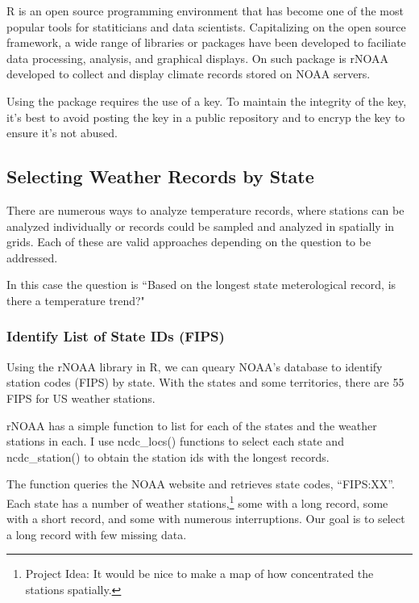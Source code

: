 \documentclass{article}
\begin{document}
R is an open source programming environment that has become one of the most popular tools for statiticians and data scientists. Capitalizing on the open source framework, a wide range of libraries or packages have been developed to faciliate data processing, analysis, and graphical displays. On such package is rNOAA developed to collect and display climate records stored on NOAA servers.

Using the package requires the use of a key. To maintain the integrity of the key, it's best to avoid posting the key in a public repository and to encryp the key to ensure it's not abused. 

\subsection{Selecting Weather Records by State}

There are numerous ways to analyze temperature records, where stations can be analyzed individually or records could be sampled and analyzed in spatially in grids. Each of these are valid approaches depending on the question to be addressed. 

In this case the question is ``Based on the longest state meterological record, is there a temperature trend?"

\subsubsection{Identify List of State IDs (FIPS)}

Using the rNOAA library in R, we can queary NOAA's database to identify station codes (FIPS) by state. With the states and some territories, there are 55 FIPS for US weather stations. 

rNOAA has a simple function to list for each of the states and the weather stations in each. I use ncdc\_locs() functions to select each state and ncdc\_station() to obtain the station ids with the longest records. 

\begin{knitrout}
\color{fgcolor}\begin{kframe}


{\ttfamily\noindent\color{warningcolor}{\#\# Warning: Error: (429) - This token has reached its temporary request limit of 10000 per day.}}\end{kframe}
\end{knitrout}

The function queries the NOAA website and retrieves state codes, ``FIPS:XX''. Each state has a number of weather stations,\footnote{Project Idea: It would be nice to make a map of how concentrated the stations spatially.} some with a long record, some with a short record, and some with numerous interruptions. Our goal is to select a long record with few missing data. 
\end{document}
